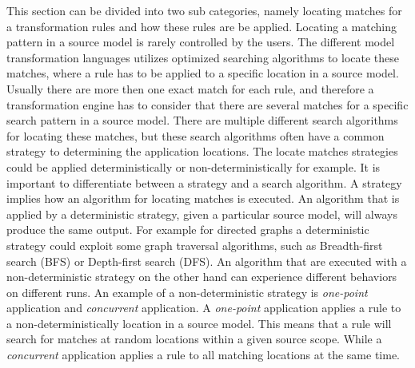 This section can be divided into two sub categories, namely locating matches for
a transformation rules and how these rules are be applied. Locating a matching
pattern in a source model is rarely controlled by the users. The different
model transformation languages utilizes optimized searching algorithms to
locate these matches, where a rule has to be applied to a specific location in
a source model. Usually there are more then one exact match for each rule, and
therefore a transformation engine has to consider that there are several
matches for a specific search pattern in a source model. There are multiple
different search algorithms for locating these matches, but these search
algorithms often have a common strategy to determining the application
locations. The locate matches strategies could be applied deterministically or
non-deterministically for example. It is important to differentiate between a
strategy and a search algorithm. A strategy implies how an algorithm for
locating matches is executed. An algorithm that is applied by a deterministic
strategy, given a particular source model, will always produce the same output.
For example for directed graphs a deterministic strategy could exploit some
graph traversal algorithms, such as Breadth-first search\cite{Dasgupta2006}
(BFS) or Depth-first\cite{Dasgupta2006} search (DFS). An algorithm that are
executed with a non-deterministic strategy on the other hand can experience
different behaviors on different runs. An example of a non-deterministic
strategy is \textit{one-point} application\cite{Czarnecki2006} and
\textit{concurrent} application. A \textit{one-point} application applies a
rule to a non-deterministically location in a source model. This means that a
rule will search for matches at random locations within a given source scope.
While a \textit{concurrent} application applies a rule to all matching
locations at the same time. 

